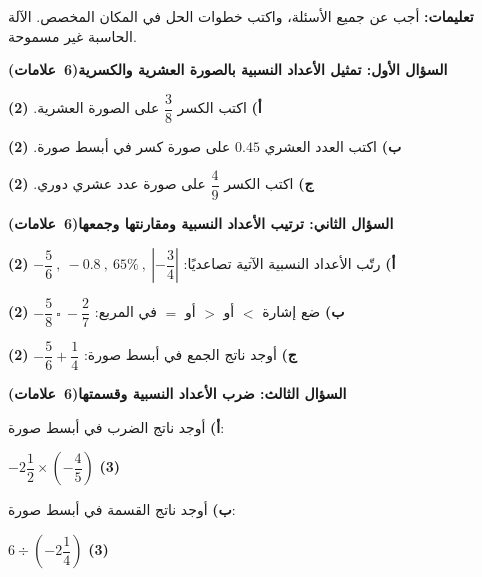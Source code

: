 \documentclass[12pt, a4paper]{article}
\newcommand{\question}[2]{%
  \par\vspace{0.25cm}\noindent
  \colorbox{gray!15}{\parbox{\dimexpr\linewidth-2\fboxsep\relax}{\textbf{\large #1}\hfill\mbox{\textbf{(#2)}}}}%
  \par\vspace{0.15cm}}
\newcommand{\pts}[1]{\hfill\mbox{\textbf{(#1)}}}
\newcommand{\sub}[3]{%
  \textbf{#1)} #2\par\vspace{#3}}
\begin{document}
\vspace{-0.1cm}
\noindent\textbf{تعليمات:} أجب عن جميع الأسئلة، واكتب خطوات الحل في المكان المخصص. الآلة الحاسبة غير مسموحة.

\question{السؤال الأول: تمثيل الأعداد النسبية بالصورة العشرية والكسرية}{6 علامات}

\noindent
\begin{minipage}[t]{0.32\linewidth}
\sub{أ}{اكتب الكسر $\dfrac{3}{8}$ على الصورة العشرية. \pts{2}}{2.3cm}
\end{minipage}\hfill\vrule\hfill
\begin{minipage}[t]{0.32\linewidth}
\sub{ب}{اكتب العدد العشري $0.45$ على صورة كسر في أبسط صورة. \pts{2}}{2.3cm}
\end{minipage}\hfill\vrule\hfill
\begin{minipage}[t]{0.32\linewidth}
\sub{ج}{اكتب الكسر $\dfrac{4}{9}$ على صورة عدد عشري دوري. \pts{2}}{2.3cm}
\end{minipage}

\question{السؤال الثاني: ترتيب الأعداد النسبية ومقارنتها وجمعها}{6 علامات}

\textbf{أ)} رتّب الأعداد النسبية الآتية تصاعديًا: \quad
$-\dfrac{5}{6} \ ,\ -0.8 \ ,\ 65\% \ ,\ \left|-\dfrac{3}{4}\right|$ \pts{2}
\vspace{1.6cm}

\noindent
\begin{minipage}[t]{0.48\linewidth}
\sub{ب}{ضع إشارة $<$ أو $>$ أو $=$ في المربع: \quad $-\dfrac{5}{8} \ \square\ -\dfrac{2}{7}$ \pts{2}}{1.8cm}
\end{minipage}\hfill\vrule\hfill
\begin{minipage}[t]{0.48\linewidth}
\sub{ج}{أوجد ناتج الجمع في أبسط صورة: \quad $-\dfrac{5}{6} + \dfrac{1}{4}$ \pts{2}}{1.8cm}
\end{minipage}

\question{السؤال الثالث: ضرب الأعداد النسبية وقسمتها}{6 علامات}

\noindent
\begin{minipage}[t]{0.48\linewidth}
\sub{أ}{أوجد ناتج الضرب في أبسط صورة: \par\vspace{0.1cm}
\centering $-2\dfrac{1}{2} \times \left(-\dfrac{4}{5}\right)$ \pts{3}}{2.9cm}
\end{minipage}\hfill\vrule\hfill
\begin{minipage}[t]{0.48\linewidth}
\sub{ب}{أوجد ناتج القسمة في أبسط صورة: \par\vspace{0.1cm}
\centering $6 \div \left(-2\dfrac{1}{4}\right)$ \pts{3}}{2.9cm}
\end{minipage}
\end{document}
